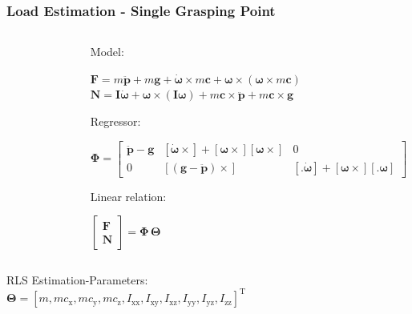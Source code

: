 \documentclass[student,noshadow]{ITRslides}
\renewcommand{\vec}[1]{\boldsymbol{#1}}
\renewcommand{\vec}[1]{\boldsymbol{#1}}
\newcommand{\scr}[1]{\mathrm{#1}}
\begin{document}
\begin{frame}
	\frametitle{Load Estimation - Single Grasping Point}
	
	\begin{columns}
		\centering
		\begin{column}{0.225\textwidth}
			\begin{figure}
				\centering
				
			\end{figure}
		\end{column}
				 		
		\begin{column}{0.775\textwidth}
			Model: \cite{literaturstelle2}\\
			\begin{center}
			$\vec{F} = m \vec{\ddot{p}} + m \vec{g} + \vec{\dot{\omega}} \times m \vec{c} + \vec{\omega} \times (\vec{\omega} \times m \vec{c})$\\
			$\vec{N} = \vec{I} \vec{\dot{\omega}} + \vec{\omega} \times (\vec{I} \vec{\omega}) + m \vec{c} \times \vec{\ddot{p}} + m \vec{c} \times \vec{g}$			
			\end{center}				
			Regressor:\\ %
			\begin{center}
			$\vec{\Phi}= 
	\begin{bmatrix}
		\vec{\ddot p} - \vec{g}	& [\vec{\dot \omega} \times] + [\vec{\omega}\times] [\vec{\omega} \times]	& 0 \\
		0			& [(\vec{g} - \vec{\ddot p}) \times]									& [.  \vec{\dot \omega}] + [\vec{\omega} \times] [. \vec{\omega}]
	\end{bmatrix}$
						
			\end{center}
	Linear relation:\\ %
	\begin{center}
	$\begin{bmatrix} \vec{F}\\ \vec{N}	\end{bmatrix} = \vec{\Phi}\, \vec{\Theta}$				
	\end{center}
		\end{column}
	\end{columns}
	RLS Estimation-Parameters: \\ %
	$\vec{\Theta} = [m, m c_\scr{x}, m c_\scr{y}, m c_\scr{z}, I_\scr{xx}, I_\scr{xy}, I_\scr{xz}, I_\scr{yy},I_\scr{yz}, I_\scr{zz}]^\scr{T}$ \\
\end{frame}
\end{document}
